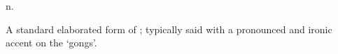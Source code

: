  n.

A standard elaborated form of ; typically said
with a pronounced and ironic accent on the `gongs'.

